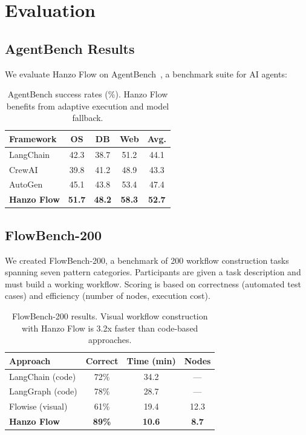 \section{Evaluation}

\label{sec:evaluation}

\subsection{AgentBench Results}

We evaluate Hanzo Flow on AgentBench~\cite{liu2023agentbench}, a benchmark suite for AI agents:

\begin{table}[H]
\centering
\small
\begin{tabular}{lcccc}
\toprule
\textbf{Framework} & \textbf{OS} & \textbf{DB} & \textbf{Web} & \textbf{Avg.} \\
\midrule
LangChain & 42.3 & 38.7 & 51.2 & 44.1 \\
CrewAI & 39.8 & 41.2 & 48.9 & 43.3 \\
AutoGen & 45.1 & 43.8 & 53.4 & 47.4 \\
\textbf{Hanzo Flow} & \textbf{51.7} & \textbf{48.2} & \textbf{58.3} & \textbf{52.7} \\
\bottomrule
\end{tabular}
\caption{AgentBench success rates (\%). Hanzo Flow benefits from adaptive execution and model fallback.}
\label{tab:agentbench}
\end{table}

\subsection{FlowBench-200}

We created FlowBench-200, a benchmark of 200 workflow construction tasks spanning seven pattern categories. Participants are given a task description and must build a working workflow. Scoring is based on correctness (automated test cases) and efficiency (number of nodes, execution cost).

\begin{table}[H]
\centering
\small
\begin{tabular}{lccc}
\toprule
\textbf{Approach} & \textbf{Correct} & \textbf{Time (min)} & \textbf{Nodes} \\
\midrule
LangChain (code) & 72\% & 34.2 & --- \\
LangGraph (code) & 78\% & 28.7 & --- \\
Flowise (visual) & 61\% & 19.4 & 12.3 \\
\textbf{Hanzo Flow} & \textbf{89\%} & \textbf{10.6} & \textbf{8.7} \\
\bottomrule
\end{tabular}
\caption{FlowBench-200 results. Visual workflow construction with Hanzo Flow is 3.2x faster than code-based approaches.}
\label{tab:flowbench}
\end{table}

